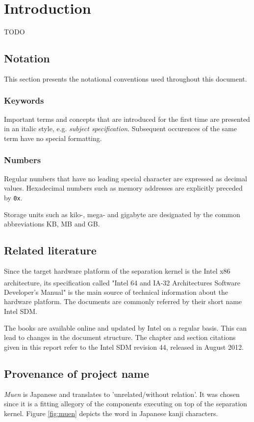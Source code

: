 \chapter{Introduction}
TODO

\section{Notation}
This section presents the notational conventions used throughout this document.

\subsection{Keywords}
Important terms and concepts that are introduced for the first time are
presented in an italic style, e.g. \emph{subject specification}. Subsequent
occurences of the same term have no special formatting.

\subsection{Numbers}
Regular numbers that have no leading special character are expressed as decimal
values. Hexadecimal numbers such as memory addresses are explicitly preceded by
\texttt{0x}.

Storage units such as kilo-, mega- and gigabyte are designated by the common
abbreviations KB, MB and GB.

\section{Related literature}
Since the target hardware platform of the separation kernel is the Intel x86
architecture, its specification called "Intel\textsuperscript{\textregistered}
64 and IA-32 Architectures Software Developer's Manual" \cite{IntelSDM} is the
main source of technical information about the hardware platform. The documents
are commonly referred by their short name Intel SDM.

The books are available online and updated by Intel on a regular basis. This
can lead to changes in the document structure. The chapter and section
citations given in this report refer to the Intel SDM revision 44, released in
August 2012.

\section{Provenance of project name}
\emph{Muen} is Japanese and translates to 'unrelated/without relation'. It was
chosen since it is a fitting allegory of the components executing on top of the
separation kernel. Figure \ref{fig:muen} depicts the word in Japanese kanji
characters.

